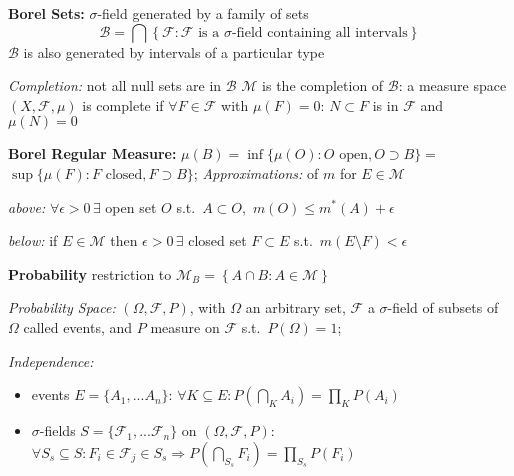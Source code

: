 \documentclass[8pt,twoside]{extarticle}
\begin{document}
\begin{multicols}{2}
\textbf{Borel Sets:} $\sigma$-field generated by a family of sets
$$\mathcal{B} =\bigcap \left\{\mathcal{F}:\mathcal{F} \text{ is a } \sigma\text{-field containing all intervals}\right\}$$
$\mathcal{B}$ is also generated by intervals of a particular type

\textit{Completion:} not all null sets are in $\mathcal{B}$ \newline
$\mathcal{M}$ is the completion of $\mathcal{B}$: a measure space $(X,\mathcal{F},\mu)$ is complete if $\forall F\in\mathcal{F}$ with $\mu(F)=0$: $N\subset F$ is in $\mathcal{F}$ and $\mu(N)=0$

\textbf{Borel Regular Measure:} $\mu(B)=\inf\{\mu(O): O \text{ open}, O\supset B\}{=}$ $\sup\{\mu(F): F \text{ closed}, F \supset B\}$;
\textit{Approximations:} of $m$ for $E\in \mathcal{M}$

\textit{above:}  
$\forall \epsilon>0\,\exists$ open set $O$ s.t.\ $A\subset O,$ $m(O)\leq m^*(A)+\epsilon$

\textit{below:} if $E \in \mathcal{M}$ then $\epsilon>0\, \exists$ closed set $F\subset E$ s.t.\ $m(E\setminus F)<\epsilon$


\textbf{Probability} restriction to $\mathcal{M}_B=\left\{A\cap B: A \in \mathcal{M}\right\}$

\textit{Probability Space:} $(\Omega, \mathcal{F}, P)$, with $\Omega$ an arbitrary set, $\mathcal{F}$ a $\sigma$-field of subsets of $\Omega$ called events, and $P$ measure on $\mathcal{F}$ s.t.\ $P(\Omega)=1$;


\textit{Independence:} 

\begin{itemize}[itemsep=0em, topsep=0pt, partopsep=0pt,parsep=0pt, leftmargin=1.0em]
\item events $E=\{A_1,... A_n\}$: $\forall K\subseteq E: P(\bigcap_K A_i)= \prod_K P(A_i)$
\item $\sigma$-fields $S=\{\mathcal{F}_1, ... \mathcal{F}_n\}$ on $(\Omega, \mathcal{F}, P)$: $\forall S_s\subseteq S: F_i \in \mathcal{F}_j \in S_s \Rightarrow P(\bigcap_{S_s} F_i)=\prod_{S_s}P(F_i)$
\end{itemize}


\end{multicols}
\end{document}

